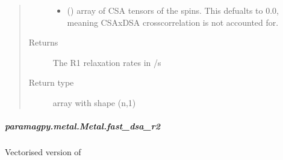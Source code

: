 \documentclass[a4paper,10pt,english,openany,oneside]{sphinxmanual}
\begin{document}
\begin{fulllineitems}
\begin{fulllineitems}
\begin{fulllineitems}
\begin{quote}
\begin{description}
\begin{itemize}
\item {} 
\sphinxAtStartPar
{} (\sphinxstyleliteralemphasis{\sphinxupquote{ (}}\sphinxstyleliteralemphasis{\sphinxupquote{,}}\sphinxstyleliteralemphasis{\sphinxupquote{,}}\sphinxstyleliteralemphasis{\sphinxupquote{) }}\sphinxstyleliteralemphasis{\sphinxupquote{(}}\sphinxstyleliteralemphasis{\sphinxupquote{)}}) \textendash{} array of CSA tensors of the spins.
This defualts to 0.0, meaning CSAxDSA crosscorrelation is
not accounted for.

\end{itemize}

\item[{Returns}] \leavevmode
\sphinxAtStartPar
{} \textendash{} The R1 relaxation rates in /s

\item[{Return type}] \leavevmode
\sphinxAtStartPar
array with shape (n,1)

\end{description}\end{quote}

\end{fulllineitems}



\subparagraph{paramagpy.metal.Metal.fast\_dsa\_r2}
\label{\detokenize{reference/generated/paramagpy.metal.Metal.fast_dsa_r2:paramagpy-metal-metal-fast-dsa-r2}}\label{\detokenize{reference/generated/paramagpy.metal.Metal.fast_dsa_r2::doc}}

\begin{fulllineitems}
\label{\detokenize{reference/generated/paramagpy.metal.Metal.fast_dsa_r2:paramagpy.metal.Metal.fast_dsa_r2}}
\sphinxAtStartPar
Vectorised version of {\hyperref[\detokenize{reference/generated/paramagpy.metal.Metal.dsa_r2:paramagpy.metal.Metal.dsa_r2}]{}}


\end{fulllineitems}
\end{fulllineitems}
\end{fulllineitems}
\end{document}
